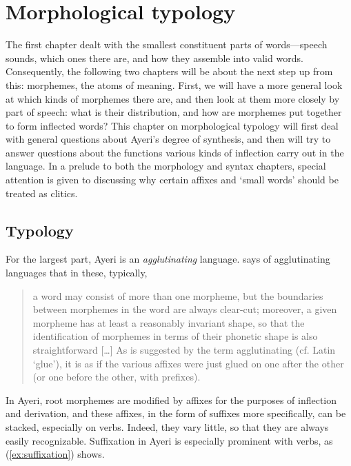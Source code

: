 \chapter{Morphological typology}
\label{ch:morphtyp}

The first chapter dealt with the smallest constituent parts of words---speech
sounds, which ones there are, and how they assemble into valid words.
Consequently, the following two chapters will be about the next step up from
this: morphemes, the atoms of meaning. First, we will have a more general look
at which kinds of morphemes there are, and then look at them more closely by
part of speech: what is their distribution, and how are morphemes put together
to form inflected words? This chapter on morphological typology will first deal
with general questions about Ayeri's degree of synthesis, and then will try to
answer questions about the functions various kinds of inflection carry out in
the language. In a prelude to both the morphology and syntax chapters, special
attention is given to discussing why certain affixes and `small words' should
be treated as clitics.

\section{Typology}
\label{sec:typology}

For the largest part, Ayeri is an \emph{agglutinating} 
language. \citet{comrie1989} says of agglutinating languages that in these, 
typically,

\blockcquote[43--44]{comrie1989}{a word may consist of more than one morpheme,
but the boundaries between morphemes in the word are always clear-cut;
moreover, a given morpheme has at least a reasonably invariant shape, so that
the identification of morphemes in terms of their phonetic shape is also
straightforward [\dots] As is suggested by the term agglutinating (cf. Latin
 `glue'), it is as if the various affixes were just glued on one 
after the other (or one before the other, with prefixes).}

In Ayeri, root morphemes are modified by affixes for the purposes of inflection
and derivation, and these affixes, in the form of suffixes more
specifically, can be stacked, especially on verbs. Indeed, they vary little, so
that they are always easily recognizable. Suffixation in Ayeri is especially
prominent with verbs, as (\ref{ex:suffixation}) shows.

